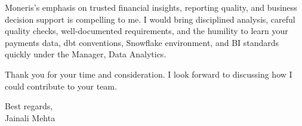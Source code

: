 \documentclass[letterpaper,11pt]{article}
\begin{document}
\bigbreak
Moneris's emphasis on trusted financial insights, reporting quality, and business decision support is compelling to me. I would bring disciplined analysis, careful quality checks, well-documented requirements, and the humility to learn your payments data, dbt conventions, Snowflake environment, and BI standards quickly under the Manager, Data Analytics.

\bigbreak
Thank you for your time and consideration. I look forward to discussing how I could contribute to your team.

\bigbreak
Best regards,\\
Jainali Mehta
\end{document}
